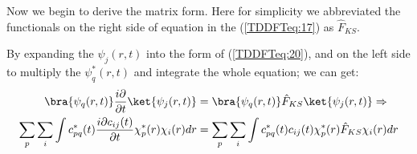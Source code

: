Now we begin to derive the matrix form. Here for simplicity we
abbreviated the functionals on the right side of equation in the
(\ref{TDDFTeq:17}) as $\hat{F}_{KS}$.

By expanding the $\psi_{j}(r,t)$ into the form of
(\ref{TDDFTeq:20}), and on the left side to multiply the
$\psi_{q}^{*}(r,t)$ and integrate the whole equation; we can get:
\begin{align}\label{TDDFTeq:18}
\bra{\psi_{q}(r,t)}\frac{i\partial}{\partial t}\ket{\psi_{j}(r,t)}
&= \bra{\psi_{q}(r,t)}\hat{F}_{KS}\ket{\psi_{j}(r,t)} \Rightarrow 
\nonumber \\
\sum_{p}\sum_{i}\int c^{*}_{pq}(t)\frac{i\partial
c_{ij}(t)}{\partial t}\chi_{p}^{*}(r)\chi_{i}(r)dr &=
\sum_{p}\sum_{i}\int
c^{*}_{pq}(t)c_{ij}(t)\chi_{p}^{*}(r)\hat{F}_{KS}\chi_{i}(r)dr
\end{align}

